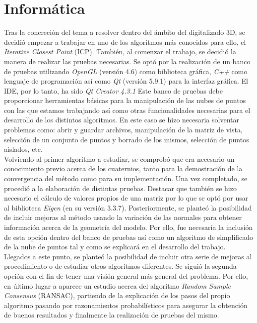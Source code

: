 \section*{Informática}
Tras la concreción del tema a resolver dentro del ámbito del digitalizado 3D, se decidió empezar a trabajar en uno de los algoritmos más conocidos para ello, el \textit{Iterative Closest Point} (ICP). También, al comenzar el trabajo, se decidió la manera de realizar las pruebas necesarias. Se optó por la realización de un banco de pruebas utilizando \textit{OpenGL} (versión 4.6) como biblioteca gráfica, \textit{C++} como lenguaje de programación así como \textit{Qt} (versión 5.9.1) para la interfaz gráfica. El IDE, por lo tanto, ha sido \textit{Qt Creator 4.3.1} Este banco de pruebas debe proporcionar herramientas básicas para la manipulación de las nubes de puntos con las que estamos trabajando así como otras funcionalidades necesarias para el desarrollo de los distintos algoritmos. En este caso se hizo necesaria solventar problemas como: abrir y guardar archivos, manipulación de la matriz de vista, selección de un conjunto de puntos y borrado de los mismos, selección de puntos aislados, etc.\\

Volviendo al primer algoritmo a estudiar, se comprobó que era necesario un conocimiento previo acerca de los cuaternios, tanto para la demostración de la convergencia del método como para su implementación. Una vez completado, se procedió a la elaboración de distintas pruebas. Destacar que también se hizo necesario el cálculo de valores propios de una matriz por lo que se optó por usar al biblioteca \textit{Eigen} (en su versión 3.3.7). Posteriormente, se planteó la posibilidad de incluir mejoras al método usando la variación de las normales para obtener información acerca de la geometría del modelo. Por ello, fue necesaria la inclusión de esta opción dentro del banco de pruebas así como un algoritmo de simplificado de la nube de puntos tal y como se explicará en el desarrollo del trabajo. \\

Llegados a este punto, se planteó la posibilidad de incluir otra serie de mejoras al procedimiento o de estudiar otros algoritmos diferentes. Se siguió la segunda opción con el fin de tener una visión general más general del problema. Por ello, en último lugar a aparece un estudio acerca del algoritmo \textit{Random Sample Consensus} (RANSAC), partiendo de la explicación de los pasos del propio algoritmo pasando por razonamientos probabilísticos para asegurar la obtención de buenos resultados y finalmente la realización de pruebas del mismo.
